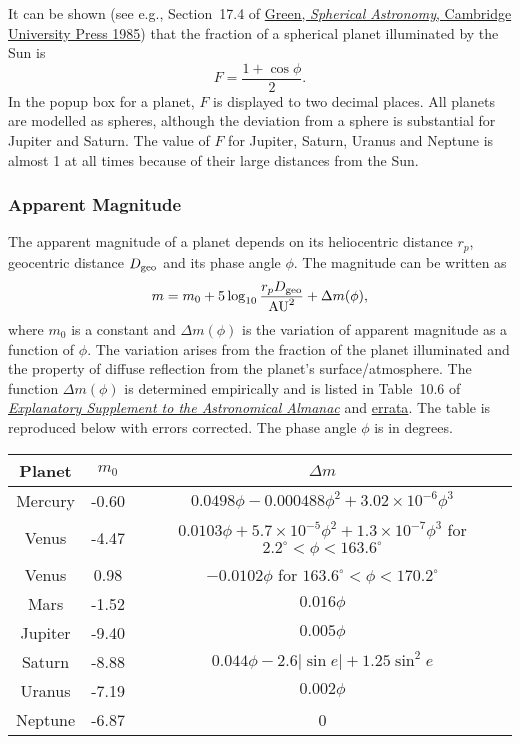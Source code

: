 \documentclass[12pt]{article}
\newcommand \beq {\begin{equation}}
\newcommand \eeq {\end{equation}}
\newcommand{\expl}{\href{http://www.uscibooks.com/urban.htm}{\it Explanatory Supplement to the Astronomical Almanac}}
\begin{document}
It can be shown (see e.g., Section~17.4 of 
\href{https://www.amazon.com/Spherical-Astronomy-Robin-M-Green/dp/0521317797}
{Green, {\it Spherical Astronomy}, Cambridge University Press 1985}) that the fraction 
of a spherical planet illuminated by the Sun is 
\beq
  F = \frac{1+\cos \phi}{2} .
\eeq
In the popup box for a planet, $F$ is displayed to two decimal places. All planets 
are modelled as spheres, although the deviation from a sphere is substantial for Jupiter 
and Saturn. The value of 
$F$ for Jupiter, Saturn, Uranus and Neptune is almost 1 at all times because of their 
large distances from the Sun. 

\subsubsection{Apparent Magnitude}

The apparent magnitude of a planet depends on its heliocentric distance $r_p$, 
geocentric distance $D_{\rm geo}$ and its phase angle $\phi$. The magnitude 
can be written as
\beq
  m = m_0 + 5\log_{10} \frac{r_p D_{\rm geo}}{{\rm AU}^2} + \Delta m(\phi) ,
\eeq
where $m_0$ is a constant and $\Delta m(\phi)$ is the variation of apparent 
magnitude as a function of $\phi$. The variation arises from the fraction of 
the planet illuminated and the property of diffuse reflection from the planet's 
surface/atmosphere. The function $\Delta m(\phi)$ is determined empirically and is 
listed in Table~10.6 of \expl{} and 
\href{http://www.uscibooks.com/urban_errata.pdf}{errata}. 
The table is reproduced below with errors corrected. The phase angle $\phi$ is 
in degrees.

\begin{tabular}{ccc}
\hline
 Planet & $m_0$ & $\Delta m$ \\ 
\hline
 Mercury & -0.60 & $0.0498 \phi - 0.000488 \phi^2 + 3.02\times 10^{-6} \phi^3$ \\ 
 Venus & -4.47 & $0.0103\phi + 5.7\times 10^{-5} \phi^2 + 1.3\times 10^{-7} \phi^3$ 
for $2.2^\circ < \phi < 163.6^\circ$ \\ 
 Venus & 0.98 & $-0.0102\phi$ for $163.6^\circ < \phi < 170.2^\circ$ \\ 
Mars & -1.52 & $0.016\phi$ \\ 
Jupiter & -9.40 & $0.005\phi$ \\ 
Saturn & -8.88 & $0.044\phi - 2.6 |\sin e| + 1.25\sin^2 e$ \\ 
Uranus & -7.19 & $0.002\phi$ \\ 
Neptune & -6.87 & 0 \\
\hline
\end{tabular}
\end{document}
